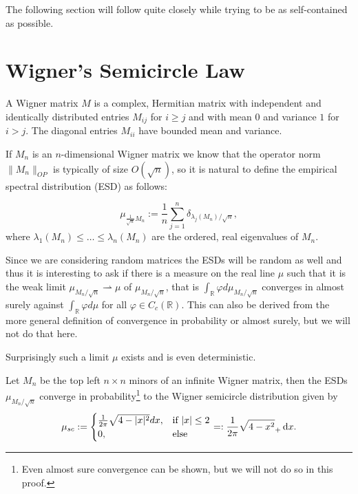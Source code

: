 The following section will follow \cite{TaoWSCL} quite closely while trying to be as self-contained as possible.

\section{Wigner's Semicircle Law}
\begin{definition}
	A Wigner matrix $M$ is a complex, Hermitian matrix with independent and identically distributed entries $M_{ij}$ for $i\geq j$ and with mean $0$ and variance $1$ for $i>j$. The diagonal entries $M_{ii}$ have bounded mean and variance.
\end{definition}

If $M_n$ is an $n$-dimensional Wigner matrix we know that the operator norm $\|M_n\|_{OP}$ is typically of size $O(\sqrt n)$, so it is natural to define the empirical spectral distribution (ESD) as follows:

\begin{definition}[ESD]
	\begin{equation*}
		\mu_{\frac{1}{\sqrt{n}}M_n}:=\frac{1}{n}\sum_{j=1}^n \delta_{\lambda_j(M_n)/\sqrt{n}},
	\end{equation*}
	where $\lambda_1(M_n)\leq\dots\leq\lambda_n(M_n)$ are the ordered, real eigenvalues of $M_n$.
\end{definition}

Since we are considering random matrices the ESDs will be random as well and thus it is interesting to ask if there is a measure on the real line $\mu$ such that it is the weak limit $\mu_{M_n/\sqrt{n}}\rightharpoonup\mu$ of $\mu_{M_n/\sqrt{n}}$, that is $\int_\mathbb{R} \varphi d\mu_{M_n/\sqrt{n}}$ converges in almost surely against $\int_\mathbb{R} \varphi d\mu$ for all $\varphi\in C_c(\mathbb R)$. This can also be derived from the more general definition of convergence in probability or almost surely, but we will not do that here.

Surprisingly such a limit $\mu$ exists and is even deterministic.

\begin{theorem}\label{thm:semicircle}
	Let $M_n$ be the top left $n\times n$ minors of an infinite Wigner matrix, then the ESDs $\mu_{M_n/\sqrt{n}}$ converge in probability\footnote{Even almost sure convergence can be shown, but we will not do so in this proof.} to the Wigner semicircle distribution given by
	\begin{equation*}
		\mu_{sc}:=\begin{cases}
						\frac{1}{2\pi}\sqrt{4-|x|^2}dx, &\mbox{if } |x|\leq 2 \\
						0, &\mbox{else}
					  \end{cases}=:\frac{1}{2\pi}\sqrt{4-x^2}_+\mathop{}\!\mathrm{d} x.
	\end{equation*}
\end{theorem}

